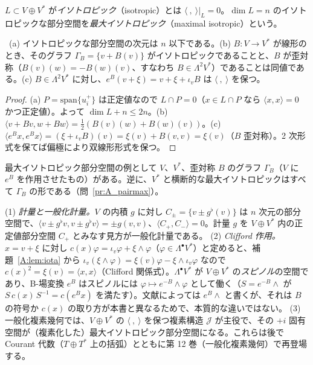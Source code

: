 \begin{defn}
$L\subset V\oplus V^*$ が\emph{イソトロピック}（isotropic）とは $\langle\ ,\ \rangle|_L=0$。$\dim L=n$ のイソトロピックな部分空間を\emph{最大イソトロピック}（maximal isotropic）という。
\end{defn}

\begin{prop}\label{A:prop:isotropic}
\tP\ (a) イソトロピックな部分空間の次元は $n$ 以下である。(b) $B:V\to V^*$ が線形のとき、そのグラフ $\Gamma_B=\{v+B(v)\}$ がイソトロピックであることと、$B$ が歪対称（$B(v)(w)=-B(w)(v)$、すなわち $B\in\Lambda^2V^*$）であることは同値である。(c) $B\in\Lambda^2V^*$ に対し、$e^B(v+\xi)=v+\xi+\iota_vB$ は $\langle\ ,\ \rangle$ を保つ。
\end{prop}
\begin{proof}
(a) $P=\mathrm{span}\{u_i^+\}$ は正定値なので $L\cap P=0$（$x\in L\cap P$ なら $\langle x,x\rangle=0$ かつ正定値）。よって $\dim L+n\le2n$。(b) $\langle v+Bv,w+Bw\rangle=\frac12(B(v)(w)+B(w)(v))$。(c) $\langle e^Bx,e^Bx\rangle=(\xi+\iota_vB)(v)=\xi(v)+B(v,v)=\xi(v)$（$B$ 歪対称）。2 次形式を保てば偏極により双線形形式を保つ。
\end{proof}

最大イソトロピック部分空間の例として $V$、$V^*$、歪対称 $B$ のグラフ $\Gamma_B$（$V$ に $e^B$ を作用させたもの）がある。逆に、$V^*$ と横断的な最大イソトロピックはすべて $\Gamma_B$ の形である（問~\ref{pr:A_pairmax}）。

\begin{rem}[後の巻との接点]
(1) \emph{計量と一般化計量。}$V$ の内積 $g$ に対し $C_\pm=\{v\pm g^\flat(v)\}$ は $n$ 次元の部分空間で、$\langle v\pm g^\flat v,v\pm g^\flat v\rangle=\pm g(v,v)$、$\langle C_+,C_-\rangle=0$。計量 $g$ を $V\oplus V^*$ 内の正定値部分空間 $C_+$ とみなす見方が一般化計量である。
(2) \emph{Clifford 作用。}$x=v+\xi$ に対し $c(x)\varphi=\iota_v\varphi+\xi\wedge\varphi$（$\varphi\in\Lambda^\bullet V^*$）と定めると、補題~\ref{A:lem:iota} から $\iota_v(\xi\wedge\varphi)=\xi(v)\varphi-\xi\wedge\iota_v\varphi$ なので $c(x)^2=\xi(v)=\langle x,x\rangle$（Clifford 関係式）。$\Lambda^\bullet V^*$ が $V\oplus V^*$ の\emph{スピノル}の空間であり、B-場変換 $e^B$ はスピノルには $\varphi\mapsto e^{-B}\wedge\varphi$ として働く（$S=e^{-B}\wedge$ が $S\,c(x)\,S^{-1}=c(e^Bx)$ を満たす）。文献によっては $e^{B}\wedge$ と書くが、それは $B$ の符号か $c(x)$ の取り方が本書と異なるためで、本質的な違いではない。
(3) 一般化複素幾何では、$V\oplus V^*$ の $\langle\ ,\ \rangle$ を保つ複素構造 $\mathcal J$ が主役で、その $+i$ 固有空間が（複素化した）最大イソトロピック部分空間になる。これらは後で Courant 代数（$T\oplus T^*$ 上の括弧）とともに第 12 巻（一般化複素幾何）で再登場する。
\end{rem}

